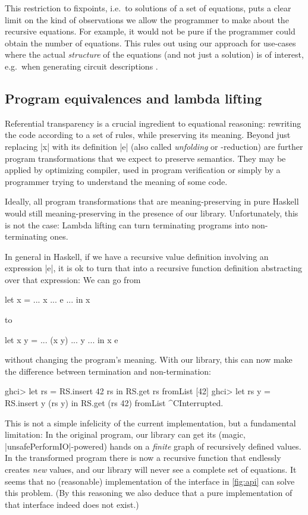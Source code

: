 \documentclass[manuscript,anonymous,screen,acmsmall]{acmart}
\begin{document}
This restriction to fixpoints, i.e.\ to solutions of a set of equations, puts a clear limit on the kind of observations we allow the programmer to make about the recursive equations. For example, it would not be pure if the programmer could obtain the number of equations. This rules out using our approach for use-cases where the actual \emph{structure} of the equations (and not just a solution) is of interest, e.g.\ when generating circuit descriptions \cite{observable-sharing}.

\subsection{Program equivalences and lambda lifting}\label{sec:sat}

Referential transparency is a crucial ingredient to equational reasoning: rewriting the code according to a set of rules, while preserving its meaning. Beyond just replacing |x| with its definition |e| (also called \emph{unfolding} or \textdelta-reduction) are further program transformations that we expect to preserve semantics. They may be applied by optimizing compiler, used in program verification or simply by a programmer trying to understand the meaning of some code.

Ideally, all program transformations that are meaning-preserving in pure Haskell would still meaning-preserving in the presence of our library. Unfortunately, this is not the case: Lambda lifting can turn terminating programs into non-terminating ones.

In general in Haskell, if we have a recursive value definition involving an expression |e|, it is ok to turn that into a recursive function definition abstracting over that expression: We can go from
\begin{code}
let x = ... x ... e ... in x
\end{code}
to
\begin{code}
let x y = ... (x y) ... y ... in x e
\end{code}
without changing the program's meaning. With our library, this can now make the difference between termination and non-termination:
\begin{code}
ghci> let rs = RS.insert 42 rs in RS.get rs
fromList [42]
ghci> let rs y = RS.insert y (rs y) in RS.get (rs 42)
fromList ^CInterrupted.
\end{code}

This is not a simple infelicity of the current implementation, but a fundamental limitation: In the original program, our library can get its (magic, |unsafePerformIO|-powered) hands on a \emph{finite} graph of recursively defined values. In the transformed program there is now a recursive function that endlessly creates \emph{new} values, and our library will never see a complete set of equations. It seems that no (reasonable) implementation of the interface in \cref{fig:api} can solve this problem. (By this reasoning we also deduce that a pure implementation of that interface indeed does not exist.)
\end{document}
